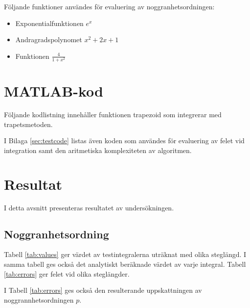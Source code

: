 \documentclass[a4paper,titlepage]{article}
\begin{document}
Följande funktioner användes för evaluering av noggranhetsordningen:

\begin{itemize}
    \item Exponentialfunktionen $e^x$
    \item Andragradspolynomet $x^2 + 2x + 1$
    \item Funktionen $\frac{4}{1 + x^2}$
\end{itemize}

\section{MATLAB-kod}

Följande kodlistning innehåller funktionen trapezoid som integrerar med trapetsmetoden.



I Bilaga \ref{sec:testcode} listas även koden som användes för evaluering av
felet vid integration samt den aritmetiska komplexiteten av algoritmen.



\section{Resultat}

I detta avsnitt presenteras resultatet av undersökningen.

\subsection{Noggranhetsordning}

Tabell \ref{tab:values}
ger värdet av testintegralerna uträknat med olika steglängd. I samma tabell ges också
det analytiskt beräknade värdet av varje integral. Tabell \ref{tab:errors}
ger felet vid olika steglängder.

I Tabell \ref{tab:errors} ges också den resulterande uppskattningen av noggrannhetsordningen
$p$.
\end{document}
